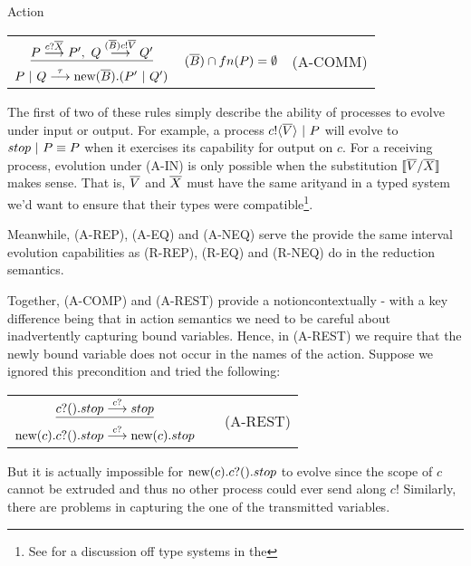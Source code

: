 \begin{definition}{Action}
\begin{center}
\begin{tabular}{rllll}
		\multicolumn{3}{c}{$\underline{P\evolves{\receives{c}{\tuple{X}}} P',\ Q \evolves{\exports{\tuple{B}}\sends{c}{\tuple{V}}} Q'}$} & \multirow{2}{*}{\footnotesize{$\textstyle ({\overline{B}})\cap fn(P) = \emptyset$ }} & \multirow{2}{*}{\tiny{(A-COMM)}}\\
		\multicolumn{3}{c}{$P\ |\  Q \overset{{\tau}}{\longrightarrow} \text{new}({\overline{B}}).(P'\ |\  Q')$}\\[10pt]
	\end{tabular}\end{center}
\end{definition}
 The first of two of these rules simply describe the ability of processes to evolve under input or output.  
For example, a process ${c}!\langle{ \ensuremath{\overline{V}} }\rangle \ |\  P$ will evolve to $stop \ |\  P \equiv P$ when it exercises its capability for output on $c$.  
For a receiving process, evolution under (A-IN) is only possible when the substitution $\llbracket{ \ensuremath{\overline{V}} }/{\overline{X}}\rrbracket$ makes sense.  
That is, $\overline{V}$ and $\overline{X}$ must have the same arityand in a typed system we'd want to ensure that their types were compatible\footnote{See \cite{henn07} for a discussion off type systems in the \picalc}.

Meanwhile, (A-REP), (A-EQ) and (A-NEQ) serve the provide the same interval evolution capabilities as (R-REP), (R-EQ) and (R-NEQ) do in the reduction semantics.

Together, (A-COMP) and (A-REST) provide a notioncontextually - with a key difference being that in action semantics we need to be careful about inadvertently capturing bound variables.  
Hence, in (A-REST) we require that the newly bound variable does not occur in the names of the action.  
Suppose we ignored this precondition and tried the following:
\begin{center}\begin{tabular}{rllll}
	\multicolumn{3}{c}{$\underline{{c}?({}).stop \overset{{{c}?{}}}{\longrightarrow} stop}$} & & \multirow{2}{*}{\tiny{(A-REST)}}\\
	\multicolumn{3}{c}{$\text{new}({c}). {c}?({}).stop \overset{{{c}?{}}}{\longrightarrow} \text{new}({c}). stop$}\\[10pt]
\end{tabular}\end{center}
But it is actually impossible for $\text{new}({c}). {c}?({}).stop$ to evolve since the scope of $c$ cannot be extruded and thus no other process could ever send along $c$!  Similarly, there are problems in capturing the one of the transmitted variables.  


